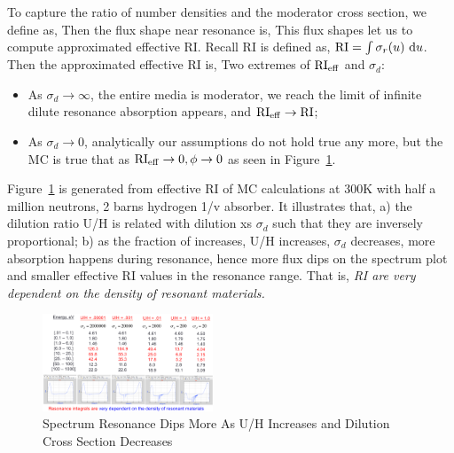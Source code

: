 \documentclass{school-22.211-notes}
\begin{document}
To capture the ratio of number densities and the moderator cross section, we define  as,
Then the flux shape near resonance is,
This flux shapes let us to compute approximated effective RI. Recall RI is defined as, $\mathrm{RI} = \int \sigma_r (u) \mbox{ }\mathrm{d} u$. Then the approximated effective RI is,
Two extremes of $\mathrm{RI}_{\mathrm{eff}}$ and $\sigma_d$:
\begin{itemize}
\item As $\sigma_d \to \infty$, the entire media is moderator, we reach the limit of infinite dilute resonance absorption appears, and $\mathrm{RI}_{\mathrm{eff}} \to \mathrm{RI}$;
\item As $\sigma_d \to 0$, analytically our assumptions do not hold true any more, but the MC is true that as $\mathrm{RI}_{\mathrm{eff}} \to 0, \phi \to 0$ as seen in Figure~\ref{dilution-factor-increase}. 
\end{itemize}
Figure~\ref{dilution-factor-increase} is generated from effective RI of MC calculations at 300K with half a million neutrons, 2 barns hydrogen 1/v absorber. It illustrates that, a) the dilution ratio U/H is related with dilution xs $\sigma_d$ such that they are inversely proportional; b) as the fraction of  increases, U/H increases, $\sigma_d$ decreases, more absorption happens during resonance, hence more flux dips on the spectrum plot and smaller effective RI values in the resonance range. That is, \textit{RI are very dependent on the density of resonant materials.}
\begin{figure}
  \centering
  \includegraphics[width=2in]{images/dilution-factor-increase.png}
  \caption{Spectrum Resonance Dips More As U/H Increases and Dilution Cross Section Decreases} \label{dilution-factor-increase}
\end{figure}
\end{document}
